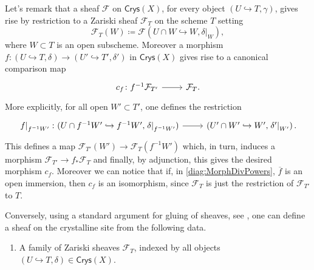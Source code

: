 \begin{rem}\label{rem:SheavesCrysX}
	Let's remark that a sheaf $\mathcal{F}$ on $\mathsf{Crys}(X)$, for every
	object $\left(U \hookrightarrow T, \gamma\right)$, gives rise by restriction
	to a Zariski sheaf $\mathcal{F}_T$ on the scheme $T$ setting
	\begin{equation*}
	\mathcal{F}_T(W) \coloneqq
	\mathcal{F}(U \cap W \hookrightarrow W, \left.\delta\right|_{W})
	,\end{equation*}
	where $W \subset T$ is an open subscheme.
	Moreover a morphism 
	$f\colon \left(U \hookrightarrow T, \delta\right) \to
	\left(U' \hookrightarrow T', \delta'\right)$
	in $\mathsf{Crys}(X)$
	gives rise to a canonical comparison map
	\begin{equation*}
	\begin{tikzcd}[row sep = 0ex
		,/tikz/column 1/.append style={anchor=base east}
		,/tikz/column 2/.append style={anchor=base west}]
		c_f\colon f^{-1}\mathcal{F}_{T'} \arrow[r, "", rightarrow] &
		\mathcal{F}_T
	.\end{tikzcd}
	\end{equation*} 
	More explicitly, for all open $W' \subset T'$, one defines the restriction
	\begin{equation*}
	\begin{tikzcd}[row sep = 0ex
		,/tikz/column 1/.append style={anchor=base east}
		,/tikz/column 2/.append style={anchor=base west}]
		\left.f\right|_{f^{-1}W'}\colon 
		(U \cap f^{-1}W' \hookrightarrow f^{-1}W', \left.\delta\right|_{f^{-1}W'} )
		\arrow[r, "", rightarrow] &
		\left(U' \cap W' \hookrightarrow W', \left.\delta'\right|_{W'} \right)
	.\end{tikzcd}
	\end{equation*} 
	This defines a map 
	$\mathcal{F}_{T'}(W') \to \mathcal{F}_T(f^{-1}W')$
	which, in turn, induces a morphism 
	$\mathcal{F}_{ T' } \to f_* \mathcal{F}_T$
	and finally, by adjunction, this gives the desired morphism $c_f$.
	Moreover we can notice that if, in \cref{diag:MorphDivPowers},
	$\overline{f}$ is an open immersion, then
	$c_f$ is an isomorphism, since $\mathcal{F}_{T}$ is just the restriction
	of $\mathcal{F}_{ T' }$ to $T$.

	Conversely, using a standard argument for gluing of sheaves, see 
	\cite[\href{https://stacks.math.columbia.edu/tag/07IN}{Section 07IN}]{SP},
	one can define a sheaf on the crystalline site from the following data.
	\begin{enumerate}
		\item A family of Zariski sheaves $\mathcal{F}_T$, indexed by 
			all objects $\left(U \hookrightarrow T, \delta\right) \in \mathsf{Crys}(X)$.


\end{enumerate}
\end{rem}
